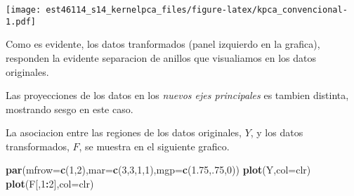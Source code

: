 \documentclass[11pt,]{article}
\newenvironment{Shaded}{\begin{snugshade}}{\end{snugshade}}
\newcommand{\KeywordTok}[1]{\textcolor[rgb]{0.13,0.29,0.53}{\textbf{#1}}}
\newcommand{\DataTypeTok}[1]{\textcolor[rgb]{0.13,0.29,0.53}{#1}}
\newcommand{\DecValTok}[1]{\textcolor[rgb]{0.00,0.00,0.81}{#1}}
\newcommand{\FloatTok}[1]{\textcolor[rgb]{0.00,0.00,0.81}{#1}}
\newcommand{\StringTok}[1]{\textcolor[rgb]{0.31,0.60,0.02}{#1}}
\newcommand{\OperatorTok}[1]{\textcolor[rgb]{0.81,0.36,0.00}{\textbf{#1}}}
\newcommand{\NormalTok}[1]{#1}
\begin{document}
\begin{Shaded}
\end{Shaded}

\texttt{[image: est46114\_s14\_kernelpca\_files/figure-latex/kpca\_convencional-1.pdf]}

Como es evidente, los datos tranformados (panel izquierdo en la
grafica), responden la evidente separacion de anillos que visualiamos en
los datos originales.

Las proyecciones de los datos en los \emph{nuevos ejes principales} es
tambien distinta, mostrando sesgo en este caso.

La asociacion entre las regiones de los datos originales, \(Y\), y los
datos transformados, \(F\), se muestra en el siguiente grafico.

\begin{Shaded}
\begin{Highlighting}[]
\KeywordTok{par}\NormalTok{(}\DataTypeTok{mfrow=}\KeywordTok{c}\NormalTok{(}\DecValTok{1}\NormalTok{,}\DecValTok{2}\NormalTok{),}\DataTypeTok{mar=}\KeywordTok{c}\NormalTok{(}\DecValTok{3}\NormalTok{,}\DecValTok{3}\NormalTok{,}\DecValTok{1}\NormalTok{,}\DecValTok{1}\NormalTok{),}\DataTypeTok{mgp=}\KeywordTok{c}\NormalTok{(}\FloatTok{1.75}\NormalTok{,.}\DecValTok{75}\NormalTok{,}\DecValTok{0}\NormalTok{))}
\KeywordTok{plot}\NormalTok{(Y,}\DataTypeTok{col=}\NormalTok{clr)}
\KeywordTok{plot}\NormalTok{(F[,}\DecValTok{1}\OperatorTok{:}\DecValTok{2}\NormalTok{],}\DataTypeTok{col=}\NormalTok{clr)}
\end{Highlighting}
\end{Shaded}
\end{document}
